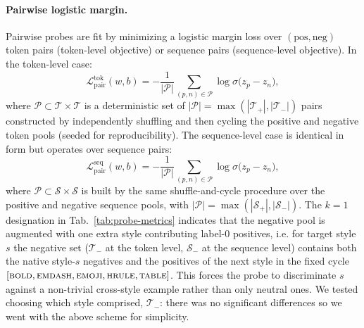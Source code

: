\documentclass{article} %
\begin{document}
\paragraph{Pairwise logistic margin.}
Pairwise probes are fit by minimizing a logistic margin loss over $(\text{pos},\text{neg})$
token pairs (token-level objective) or sequence pairs (sequence-level objective). In the token-level case:
\begin{equation}
\mathcal{L}_{\mathrm{pair}}^{\mathrm{tok}}(w, b)
= -\frac{1}{|\mathcal{P}|}\sum_{(p,n)\in\mathcal{P}}
  \log\sigma\bigl(z_p - z_n\bigr),
\label{eq:bt-contrast-loss-probe-tok}
\end{equation}
where $\mathcal{P}\subset\mathcal{T}\times\mathcal{T}$ is a deterministic
set of $|\mathcal{P}| = \max(|\mathcal{T}_+|,|\mathcal{T}_-|)$ pairs
constructed by independently shuffling and then cycling the positive and
negative token pools (seeded for reproducibility). The sequence-level case is identical in form but operates over sequence pairs:
\begin{equation}
\mathcal{L}_{\mathrm{pair}}^{\mathrm{seq}}(w, b)
= -\frac{1}{|\mathcal{P}|}\sum_{(p,n)\in\mathcal{P}}
  \log\sigma\bigl(z_p - z_n\bigr),
\label{eq:bt-contrast-loss-probe-seq}
\end{equation}
where $\mathcal{P}\subset\mathcal{S}\times\mathcal{S}$ is built by the same shuffle-and-cycle procedure over the positive and negative sequence pools, with $|\mathcal{P}| = \max(|\mathcal{S}_+|,|\mathcal{S}_-|)$. The $k{=}1$ designation in Tab.~\ref{tab:probe-metrics}
indicates that the negative pool is augmented with one extra style
contributing label-$0$ positives, i.e. for target style $s$ the negative
set ($\mathcal{T}_-$ at the token level, $\mathcal{S}_-$ at the sequence level) contains both the native style-$s$ negatives and the
positives of the next style in the fixed cycle
$[\textsc{bold},\textsc{emdash},\textsc{emoji},\textsc{hrule},\textsc{table}]$.
This forces the probe to discriminate $s$ against a non-trivial
cross-style example rather than only neutral ones. We tested choosing which style comprised, $\mathcal T_-$: there was no significant differences so we went with the above scheme for simplicity.

\end{document}
